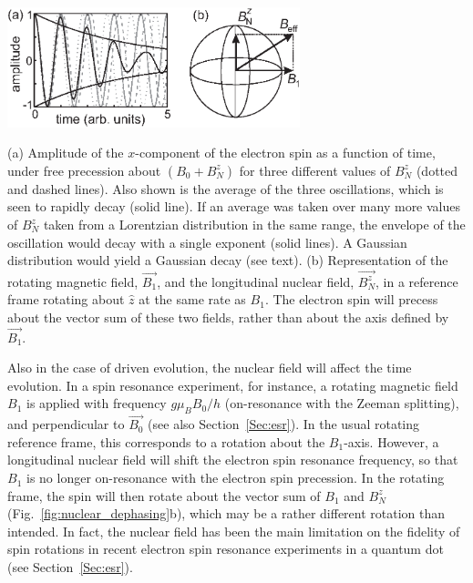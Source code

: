 \documentclass[rmp,twocolumn,aps]{revtex4}
\begin{document}
\bfig
\begin{center}
\includegraphics[width=8.5cm]{hanson_fig26.eps}
\end{center}
\caption{(a) Amplitude of the $x$-component of the electron spin
as a function of time, under free precession about $(B_0 + B_N^z)$
for three different values of $B_N^z$ (dotted and dashed lines).
Also shown is the average of the three oscillations, which is seen
to rapidly decay (solid line). If an average was taken over many
more values of $B_N^z$ taken from a Lorentzian distribution in the same range, the envelope of the
oscillation would decay with a single exponent (solid lines). A Gaussian distribution would yield a Gaussian decay (see text). (b)
Representation of the rotating magnetic field, $\vec{B_1}$, and
the longitudinal nuclear field, $\vec{B_N^z}$, in a reference
frame rotating about $\hat{z}$ at the same rate as $B_1$. The
electron spin will precess about the vector sum of these two
fields, rather than about the axis defined by $\vec{B_1}$.}
\label{fig:nuclear_dephasing} \efig

Also in the case of driven evolution, the nuclear field will
affect the time evolution. In a spin resonance experiment, for
instance, a rotating magnetic field $B_1$ is applied with
frequency $g \mu_B B_0/h$ (on-resonance with the Zeeman
splitting), and perpendicular to $\vec{B_0}$ (see also
Section~\ref{Sec:esr}). In the usual rotating reference frame,
this corresponds to a rotation about the $B_1$-axis. However, a
longitudinal nuclear field will shift the electron spin resonance
frequency, so that $B_1$ is no longer on-resonance with the
electron spin precession. In the rotating frame, the spin will
then rotate about the vector sum of $B_1$ and $B_N^z$
(Fig.~\ref{fig:nuclear_dephasing}b), which may be a rather
different rotation than intended. In fact, the nuclear field has
been the main limitation on the fidelity of spin rotations in
recent electron spin resonance experiments in a quantum dot (see
Section~\ref{Sec:esr}).
\end{document}
